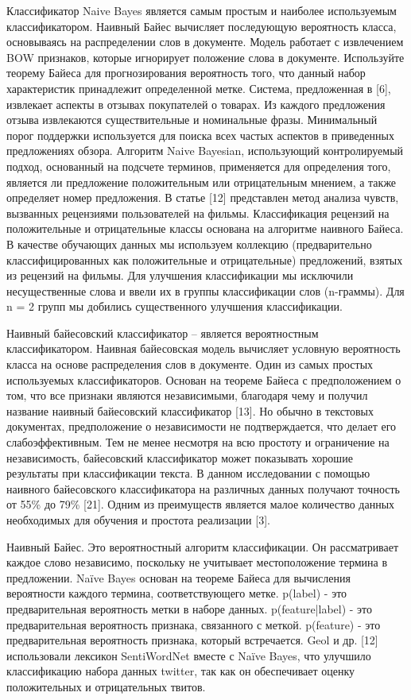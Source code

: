 Классификатор Naive Bayes является самым простым и наиболее используемым
классификатором. Наивный Байес вычисляет последующую вероятность класса,
основываясь на распределении слов в документе. Модель работает с извлечением BOW
признаков, которые игнорирует положение слова в документе. Используйте теорему
Байеса для прогнозирования вероятность того, что данный набор характеристик
принадлежит определенной метке.
Система, предложенная в [6], извлекает аспекты в отзывах покупателей о товарах.
Из каждого предложения отзыва извлекаются существительные и номинальные фразы.
Минимальный порог поддержки используется для поиска всех частых аспектов в
приведенных предложениях обзора. Алгоритм Naive Bayesian, использующий
контролируемый подход, основанный на подсчете терминов, применяется для
определения того, является ли предложение положительным или отрицательным
мнением, а также определяет номер предложения. В статье [12] представлен метод
анализа чувств, вызванных рецензиями пользователей на фильмы. Классификация
рецензий на положительные и отрицательные классы основана на алгоритме наивного
Байеса. В качестве обучающих данных мы используем коллекцию (предварительно
классифицированных как положительные и отрицательные) предложений, взятых из
рецензий на фильмы. Для улучшения классификации мы исключили несущественные
слова и ввели их в группы классификации слов (n-граммы). Для n = 2 групп мы
добились существенного улучшения классификации. \cite{article4}

Наивный байесовский классификатор – является вероятностным классификатором.
Наивная байесовская модель вычисляет условную вероятность класса на основе
распределения слов в документе. Один из самых простых используемых
классификаторов. Основан на теореме Байеса с предположением о том, что все
признаки являются независимыми, благодаря чему и получил название наивный
байесовский классификатор [13]. Но обычно в текстовых документах, предположение
о независимости не подтверждается, что делает его слабоэффективным. Тем не менее
несмотря на всю простоту и ограничение на независимость, байесовский
классификатор может показывать хорошие результаты при классификации текста. В
данном исследовании с помощью наивного байесовского классификатора на различных
данных получают точность от 55\% до 79\% [21]. Одним из преимуществ является
малое количество данных необходимых для обучения и простота реализации [3].
\cite{article9}

Наивный Байес. Это вероятностный алгоритм классификации. Он рассматривает каждое
слово независимо, поскольку не учитывает местоположение термина в предложении.
Naïve Bayes основан на теореме Байеса для вычисления вероятности каждого
термина, соответствующего метке. 
p(label) - это предварительная вероятность
метки в наборе данных. p(feature|label) - это предварительная вероятность
признака, связанного с меткой. p(feature) - это предварительная вероятность
признака, который встречается. Geol и др. [12] использовали лексикон
SentiWordNet вместе с Naïve Bayes, что улучшило классификацию набора данных
twitter, так как он обеспечивает оценку положительных и отрицательных твитов.
\cite{article16}

